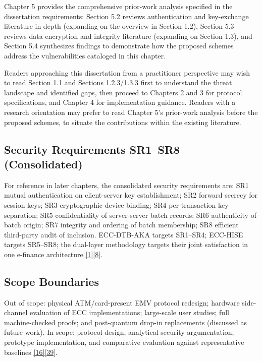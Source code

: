 \indent Chapter 5 provides the comprehensive prior-work analysis specified in the dissertation requirements: Section 5.2 reviews authentication and key-exchange literature in depth (expanding on the overview in Section 1.2), Section 5.3 reviews data encryption and integrity literature (expanding on Section 1.3), and Section 5.4 synthesizes findings to demonstrate how the proposed schemes address the vulnerabilities cataloged in this chapter.

\indent Readers approaching this dissertation from a practitioner perspective may wish to read Section 1.1 and Sections 1.2.3/1.3.3 first to understand the threat landscape and identified gaps, then proceed to Chapters 2 and 3 for protocol specifications, and Chapter 4 for implementation guidance. Readers with a research orientation may prefer to read Chapter 5's prior-work analysis before the proposed schemes, to situate the contributions within the existing literature.

\subsection{Security Requirements SR1--SR8 (Consolidated)}

\indent For reference in later chapters, the consolidated security requirements are: SR1 mutual authentication on client-server key establishment; SR2 forward secrecy for session keys; SR3 cryptographic device binding; SR4 per-transaction key separation; SR5 confidentiality of server-server batch records; SR6 authenticity of batch origin; SR7 integrity and ordering of batch membership; SR8 efficient third-party audit of inclusion. ECC-DTB-AKA targets SR1--SR4; ECC-HISE targets SR5--SR8; the dual-layer methodology targets their joint satisfaction in one e-finance architecture \hyperref[ref:1]{[1]}\hyperref[ref:8]{[8]}.

\subsection{Scope Boundaries}

\indent Out of scope: physical ATM/card-present EMV protocol redesign; hardware side-channel evaluation of ECC implementations; large-scale user studies; full machine-checked proofs; and post-quantum drop-in replacements (discussed as future work). In scope: protocol design, analytical security argumentation, prototype implementation, and comparative evaluation against representative baselines \hyperref[ref:16]{[16]}\hyperref[ref:39]{[39]}.

